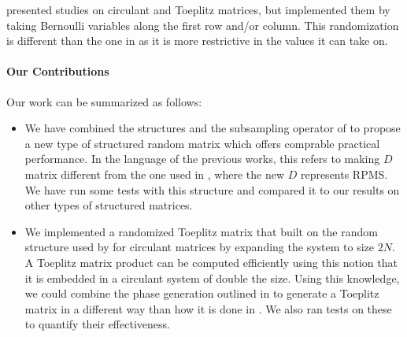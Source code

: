 \cite{wotao} presented studies on circulant and Toeplitz matrices, but implemented them by taking Bernoulli variables along the first row and/or column. This randomization is different than the one in \cite{romberg2009} as it is more restrictive in the values it can take on. 

\paragraph{Our Contributions}
Our work can be summarized as follows:
\begin{itemize}
	\item We have combined the structures \cite{doetal} and the subsampling operator 
		of \cite{romberg2009} to propose a new type of structured random matrix which offers 
		comprable practical performance. In the language of the previous works, this refers
		to making $D$ matrix different from the one used in \cite{doetal}, where the new $D$
		represents RPMS. We have run some tests with this structure and compared it to 
		our results on other types of structured matrices.
	\item We implemented a randomized Toeplitz matrix that built on the random structure
		used by \cite{romberg2009} for circulant matrices by expanding the system to size
		$2N$. A Toeplitz matrix product can be computed efficiently using this notion that 
		it is embedded in a circulant system of double the size. Using this knowledge, we 
		could combine the phase generation outlined in \cite{romberg2009} to generate a 
		Toeplitz matrix in a different way than how it is done in \cite{wotao}. We also ran 
		tests on these to quantify their effectiveness. 
\end{itemize}

